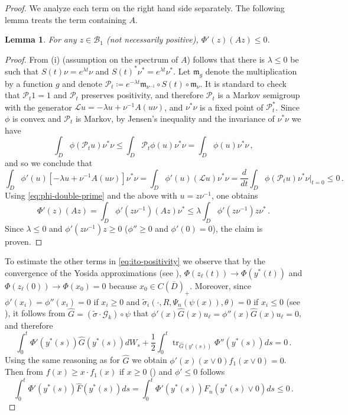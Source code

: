 \documentclass[final]{amsart}
\newtheorem{lem}[thm]{Lemma}
\numberwithin{thm}{section}
\numberwithin{equation}{section}
\newcommand{\Pp}{\mathcal{P}}
\newcommand{\Ll}{\mathcal{L}}
\newcommand{\tr}{\operatorname{tr}}
\newcommand{\B}{\mathcal{B}}
\begin{document}
\begin{proof}
    We analyze each term on the right hand side separately. The following lemma treats the term containing $A$. 
    
    \begin{lem}\label{lem:e-Phi-is-noninc}
        For any $z \in \B_1$ (not necessarily positive), $\Phi'(z)(Az) \leq 0$.
    \end{lem}
    
    \begin{proof}
    From  (i) (assumption on the spectrum of $A$) follows that there is 
$\lambda \leq 0$ be such that $S(t)\nu = e^{\lambda t}\nu$ and $S(t)^*\nu^* = e^{\lambda t}\nu^*$. 
        Let $\mathfrak{m}_g$ denote the multiplication by a function $g$ and denote $\Pp_t \coloneqq e^{-\lambda t} \mathfrak{m}_{\nu^{-1}} \circ S(t) \circ \mathfrak{m}_\nu$. It is standard to check that $\Pp_t 1 = 1$ and $\Pp_t$ preserves positivity, and therefore $\Pp_t$ is a Markov semigroup with the generator
         $\Ll u = -\lambda u + \nu^{-1}A(u\nu)$, and $\nu^* \nu$ is a fixed point of $\Pp_t^*$. Since $\phi$ is convex and $\Pp_t$ is Markov, 
         by Jensen's inequality and the invariance of $\nu^* \nu$ we have
        $$
        \int_D \phi(\Pp_t u)\nu^*\nu \leq \int_D \Pp_t\phi(u)\nu^*\nu = \int_D \phi(u)\nu^*\nu \,,
        $$
        and so we conclude that
        $$\int_D \phi'(u)[-\lambda u + \nu^{-1}A(u\nu)]\nu^*\nu  = \int_D \phi'(u)(\Ll u)\nu^*\nu = \frac{d}{dt} \int_D \phi(\Pp_t u)\nu^*\nu \Big|_{t = 0} \leq 0 \,.$$
        Using \eqref{eq:phi-double-prime} and the above with $u = z\nu^{-1}$, one obtains
        $$\Phi'(z)(Az) = \int_D \phi'(z\nu^{-1})(Az)\nu^* \leq \lambda \int_D \phi'(z\nu^{-1})z\nu^* \,.$$
        Since $\lambda \leq 0$ and $\phi'(z\nu^{-1})z \geq 0$ ($\phi'' \geq 0$ and $\phi'(0) = 0$), the claim is proven.
    \end{proof}

    
    To estimate the other terms in \eqref{eq:ito-positivity} we observe that 
    by the convergence of the Yosida approximations (see ), $\Phi(z_\ell(t)) \to \Phi(y^*(t))$ and $\Phi(z_\ell(0)) \to \Phi(x_0) = 0$ because $x_0 \in C(\overline D)_+$. Moreover, since $\phi'(x_i) = \phi''(x_i) = 0$ if $x_i \geq 0$ and $\tilde \sigma_i(\cdot,R,\Psi_n(\psi(x)),\theta) = 0$ if $x_i \leq 0$ (see ), it follows from $\hat G = (\tilde{\sigma} \cdot \mathcal{G}_k) \circ \psi$ that
$\phi'(x) \hat G(x)u_\ell = \phi''(x) \hat G(x)u_\ell = 0$, and therefore 
    $$
    \int_0^t \Phi'(y^*(s))\hat G(y^*(s))dW_s + \frac{1}{2}\int_0^t \tr_{\hat G(y^*(s))}\Phi''(y^*(s))ds = 0\,.
    $$
    Using the same reasoning as for $\hat G$ we obtain 
$\phi'(x)(x \vee 0)f_1(x \vee 0) = 0$. Then from 
 $f(x) \geq x\cdot f_1(x)$ if $x \geq 0$ () and $\phi' \leq 0$ follows
    $$
    \int_0^t \Phi'(y^*(s))\hat F(y^*(s))ds 
    = 
    \int_0^t \Phi'(y^*(s)) F_n(y^*(s)\vee 0)ds 
    \leq 0 \,.
    $$
    

\end{proof}
\end{document}
